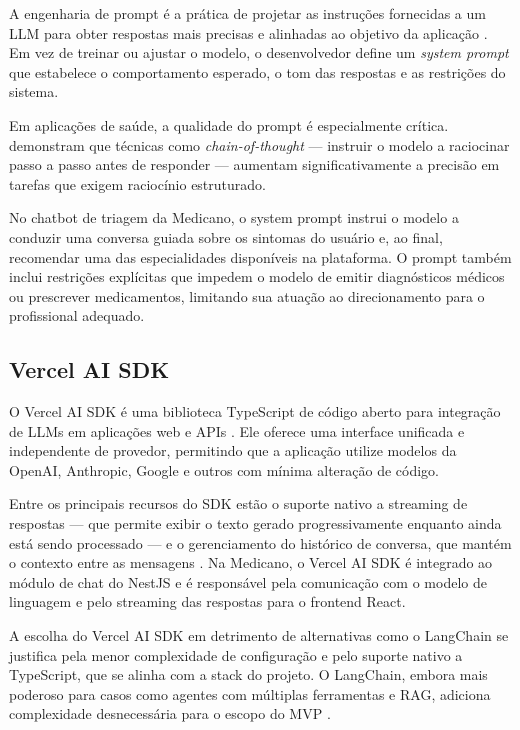 A engenharia de prompt é a prática de projetar as
instruções fornecidas a um LLM para obter respostas mais
precisas e alinhadas ao objetivo da aplicação
\cite{wei2022}. Em vez de treinar ou ajustar o modelo,
o desenvolvedor define um \textit{system prompt} que
estabelece o comportamento esperado, o tom das respostas
e as restrições do sistema.

Em aplicações de saúde, a qualidade do prompt é
especialmente crítica.  demonstram
que técnicas como \textit{chain-of-thought} — instruir
o modelo a raciocinar passo a passo antes de responder
— aumentam significativamente a precisão em tarefas
que exigem raciocínio estruturado.

No chatbot de triagem da Medicano, o system prompt
instrui o modelo a conduzir uma conversa guiada sobre
os sintomas do usuário e, ao final, recomendar uma
das especialidades disponíveis na plataforma. O prompt
também inclui restrições explícitas que impedem o
modelo de emitir diagnósticos médicos ou prescrever
medicamentos, limitando sua atuação ao direcionamento
para o profissional adequado.

\subsection{Vercel AI SDK}
\label{subsec:vercel-ai-sdk}

O Vercel AI SDK é uma biblioteca TypeScript de código
aberto para integração de LLMs em aplicações web e APIs
\cite{vercelaisdk2024}. Ele oferece uma interface
unificada e independente de provedor, permitindo que a
aplicação utilize modelos da OpenAI, Anthropic, Google
e outros com mínima alteração de código.

Entre os principais recursos do SDK estão o suporte
nativo a streaming de respostas — que permite exibir
o texto gerado progressivamente enquanto ainda está
sendo processado — e o gerenciamento do histórico de
conversa, que mantém o contexto entre as mensagens
\cite{vercelaisdk2024}. Na Medicano, o Vercel AI SDK
é integrado ao módulo de chat do NestJS e é responsável
pela comunicação com o modelo de linguagem e pelo
streaming das respostas para o frontend React.

A escolha do Vercel AI SDK em detrimento de alternativas
como o LangChain se justifica pela menor complexidade
de configuração e pelo suporte nativo a TypeScript, que
se alinha com a stack do projeto. O LangChain, embora
mais poderoso para casos como agentes com múltiplas
ferramentas e RAG, adiciona complexidade desnecessária
para o escopo do MVP \cite{vercelaisdk2024}.

